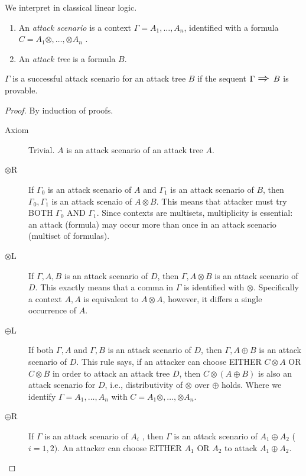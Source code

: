 \begin{definition} 
We interpret in classical linear logic.
\begin{enumerate}
\item An {\it attack scenario} is a context $\Gamma = A_1, \ldots , A_n$,
 identified with a formula $C = A_1 \otimes, \ldots, \otimes A_n$ . 
\item An {\it attack tree} is a formula $B$.
\end{enumerate}
\end{definition}

\begin{theorem} 
$\Gamma$ is a successful attack scenario for an attack tree $B$ 
if the sequent $\Gamma \mbox{ \Large$\Rightarrow$ } B$ is provable.  
\end{theorem}

\begin{proof} 
By induction of proofs. 
\begin{description}
\item[Axiom]
Trivial. $A$ is an attack scenario of an attack tree $A$. 
\item[$\otimes$R]
If $  \Gamma_0$  is an attack scenario of $A$ and $\Gamma_1$ is an attack scenario of $B$, 
then $\Gamma_0,\Gamma_1$ is an attack scenaio of $A\otimes B$. 
This means that attacker must try BOTH $\Gamma_0$ AND $\Gamma_1$. 
Since contexts are multisets, multiplicity is essential: 
an attack (formula) may occur more than once in an attack scenario (multiset of formulas). 
\item[$\otimes$L]
If $  \Gamma,A,B$  is an attack scenario of $D$,  
then $\Gamma,A\otimes B$ is an attack scenario of $D$. 
This exactly means that a comma in $\Gamma$ is identified with $\otimes$. 
Specifically a context $A,A$ is equivalent to $A \otimes A$,  
however,  it differs a single occurrence of $A$. 
%
\item[$\oplus$L]
If both $\Gamma,A$ and $\Gamma,B$ is an attack scenario of $D$, then $\Gamma,A\oplus B$ is an attack scenario of $D$.  
This rule says,
if an attacker can choose EITHER $C \otimes A$ OR $C \otimes B$  in order to attack  an attack tree $D$,
then $C \otimes (A \oplus B)$ is also an attack scenario for $D$,
 i.e.,  distributivity of $\otimes$ over $\oplus$ holds. 
Where we identify $\Gamma = A_1,\ldots, A_n$ with $C = A_1 \otimes,\ldots, \otimes A_n$. 
%
\item[$\oplus$R]
If $  \Gamma$  is an attack scenario of $A_i$ , then $\Gamma$ is an attack scenario of $A_1 \oplus A_2$ ($i = 1,2)$.  An attacker can choose EITHER $A_1$ OR $A_2$ to attack $A_1 \oplus A_2$. 
\end{description}
\end{proof}

